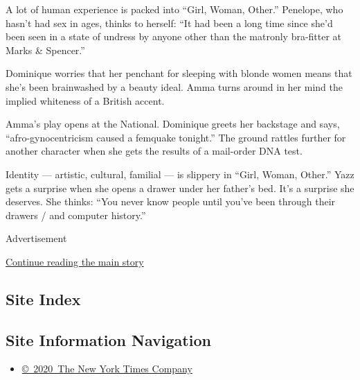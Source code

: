 A lot of human experience is packed into ``Girl, Woman, Other.''
Penelope, who hasn't had sex in ages, thinks to herself: ``It had been a
long time since she'd been seen in a state of undress by anyone other
than the matronly bra-fitter at Marks \& Spencer.''

Dominique worries that her penchant for sleeping with blonde women means
that she's been brainwashed by a beauty ideal. Amma turns around in her
mind the implied whiteness of a British accent.

Amma's play opens at the National. Dominique greets her backstage and
says, ``afro-gynocentricism caused a femquake tonight.'' The ground
rattles further for another character when she gets the results of a
mail-order DNA test.

Identity --- artistic, cultural, familial --- is slippery in ``Girl,
Woman, Other.'' Yazz gets a surprise when she opens a drawer under her
father's bed. It's a surprise she deserves. She thinks: ``You never know
people until you've been through their drawers / and computer history.''

Advertisement

\protect\hyperlink{after-bottom}{Continue reading the main story}

\hypertarget{site-index}{%
\subsection{Site Index}\label{site-index}}

\hypertarget{site-information-navigation}{%
\subsection{Site Information
Navigation}\label{site-information-navigation}}

\begin{itemize}
\tightlist
\item
  \href{https://help.nytimes.com/hc/en-us/articles/115014792127-Copyright-notice}{©~2020~The
  New York Times Company}
\end{itemize}

